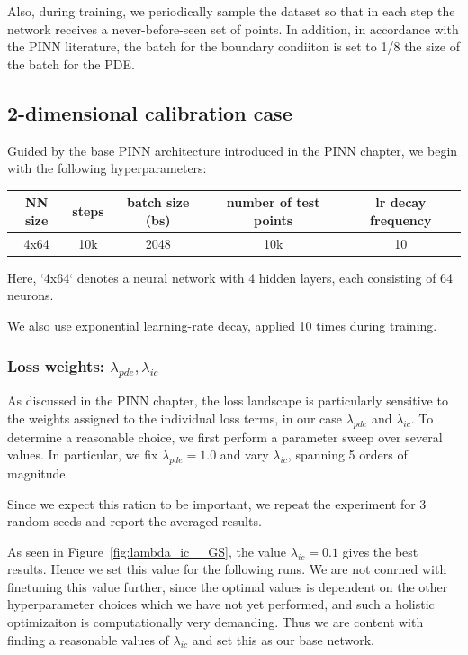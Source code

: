 Also, during training, we periodically sample the dataset so that in each step the network receives a never-before-seen set
of points. In addition, in accordance with the PINN literature, the batch for the boundary condiiton is set to 1/8 the size of the
batch for the PDE.\cite{experts_guide}


\subsection{2-dimensional calibration case}

Guided by the base PINN architecture introduced in the PINN chapter, we begin with the following hyperparameters:
\begin{center}
\begin{tabular}{ |c|c|c|c|c } 
\hline
NN size & steps & batch size (bs) & number of test points & lr decay frequency\\
\hline
4x64  & 10k & 2048 & 10k & 10\\
\hline
\end{tabular}
\end{center}
Here, `4x64` denotes a neural network with 4 hidden layers, each consisting of 64 neurons.

We also use exponential learning-rate decay, applied 10 times during training.




\subsubsection{Loss weights: $\lambda_{pde}, \lambda_{ic}$}
As discussed in the PINN chapter, the loss landscape is particularly sensitive
to the weights assigned to the individual loss terms, in our case $\lambda_{pde}$ and $\lambda_{ic}$.
To determine a reasonable choice, we first perform
a parameter sweep over several values. In particular, we fix $\lambda_{pde}=1.0$ and vary $\lambda_{ic}$,
spanning 5 orders of magnitude.

Since we expect this ration to be important, we repeat the experiment for 3 random seeds and report the averaged results.

As seen in Figure~\ref{fig:lambda_ic__GS}, the value $\lambda_{ic}=0.1$ gives the best results.
Hence we set this value for the following runs. We are not conrned with finetuning this value further, since the
optimal values is dependent on the other hyperparameter choices which we have not yet performed, and such a holistic
optimizaiton is computationally very demanding.
Thus we are content with finding a reasonable values of $\lambda_{ic}$ and set this as our base network.

